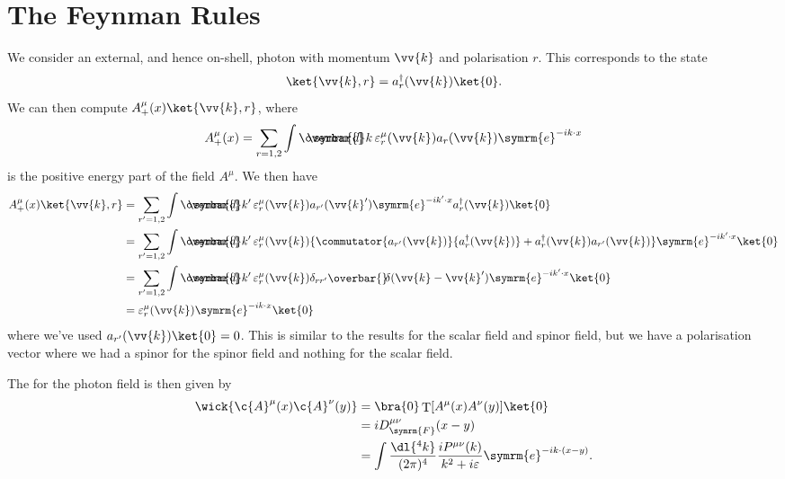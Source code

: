 \documentclass[fleqn]{NotesClass}
\newcommand{\e}{\symrm{e}}
\newcommand{\hermit}{{\dagger}}
\newcommand{\dbar}[1][0.0]{\ThisStyle{\ensurestackMath{%
            \stackengine{#1\LMex}{\SavedStyle \symrm{d}}{\SavedStyle\overbar{}%
                \mkern2.25mu}{O}{r}{F}{F}{L}}}}
\newcommand{\invariantmeasure}[1]{%
    \mathchoice{\dbar #1}{\dbar #1}{\dbar[.05] #1}{\dbar[.06] #1}
}
\newcommand\bardelta{\ThisStyle{\ensurestackMath{%
            \stackengine{-.3\LMpt}{\SavedStyle \delta}{\SavedStyle\overbar{}%
                \mkern4.5mu}{O}{r}{F}{F}{L}}}}
\DeclareMathOperator{\timeOrdering}{T}
\newcommand{\feynman}{\symrm{F}}
\begin{document}
    \section{The Feynman Rules}
    We consider an external, and hence on-shell, photon with momentum \(\vv{k}\) and polarisation \(r\).
    This corresponds to the state
    \begin{equation}
        \ket{\vv{k}, r} = a_r^\hermit(\vv{k})\ket{0}.
    \end{equation}
    We can then compute \(A_+^\mu(x) \ket{\vv{k}, r}\), where
    \begin{equation}
        A_+^\mu(x) = \sum_{r=1,2} \int \invariantmeasure{k} \, \varepsilon_r^\mu(\vv{k}) a_r(\vv{k}) \e^{-ik\cdot x}
    \end{equation}
    is the positive energy part of the field \(A^\mu\).
    We then have
    \begin{align}
        A_+^\mu(x) \ket{\vv{k}, r} &= \sum_{r'=1,2} \int \invariantmeasure{k'} \, \varepsilon_r^\mu(\vv{k}) a_{r'}(\vv{k}') \e^{-ik'\cdot x} a_r^\hermit(\vv{k}) \ket{0}\\
        &= \sum_{r'=1,2} \int \invariantmeasure{k'} \, \varepsilon_r^\mu(\vv{k}) \{\commutator{a_{r'}(\vv{k})}{a_r^\hermit(\vv{k})} + a_r^{\hermit}(\vv{k}) a_{r'}(\vv{k})\} \e^{-ik'\cdot x} \ket{0}\\
        &= \sum_{r'=1,2} \int \invariantmeasure{k'} \, \varepsilon_r^\mu(\vv{k}) \delta_{rr'}\bardelta(\vv{k} - \vv{k}') \e^{-ik'\cdot x} \ket{0}\\
        &= \varepsilon_r^\mu(\vv{k}) \e^{-ik\cdot x} \ket{0}
    \end{align}
    where we've used \(a_{r'}(\vv{k}) \ket{0} = 0\).
    This is similar to the results for the scalar field and spinor field, but we have a polarisation vector where we had a spinor for the spinor field and nothing for the scalar field.
    
    The  for the photon field is then given by
    \begin{align}
        \wick{\c{A}^\mu(x) \c{A}^\nu(y)} &= \bra{0} \timeOrdering[A^\mu(x) A^\nu(y)] \ket{0}\\
        &= i D_{\feynman}^{\mu\nu}(x - y)\\
        &= \int \frac{\dl{^4k}}{(2\pi)^4} \frac{iP^{\mu\nu}(k)}{k^2 + i\varepsilon} \e^{-ik \cdot (x - y)}.
    \end{align}
    
\end{document}
